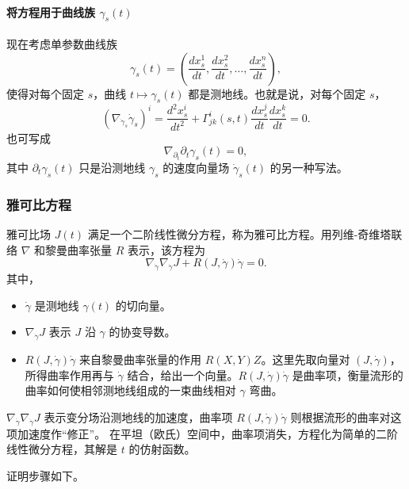 \paragraph{将方程用于曲线族 \texorpdfstring{$\gamma_s(t)$}{γₛ(t)}}
现在考虑单参数曲线族
\[
  \gamma_s(t)=\left(\frac{dx_s^1}{dt},\frac{dx_s^2}{dt},\ldots,
                     \frac{dx_s^n}{dt}\right),
\]
使得对每个固定 $s$，曲线 $t\mapsto\gamma_s(t)$ 都是测地线。也就是说，对每个固定 $s$，
\begin{equation*}
  (\nabla_{\dot\gamma_s}\dot\gamma_s)^i
    =\frac{d^2x_s^i}{dt^2}+\Gamma^i_{jk}(s,t)
       \frac{dx_s^j}{dt}\frac{dx_s^k}{dt}=0.
  \tag{5.34}\label{eq:5.34}
\end{equation*}
也可写成
\begin{equation*}
  \nabla_{\partial_t}\partial_t\gamma_s(t)=0,
  \tag{5.35}\label{eq:5.35}
\end{equation*}
其中 $\partial_t\gamma_s(t)$ 只是沿测地线 $\gamma_s$ 的速度向量场 $\dot\gamma_s(t)$ 的另一种写法。

\subsubsection{雅可比方程}
雅可比场 $J(t)$ 满足一个二阶线性微分方程，称为雅可比方程。用列维-奇维塔联络 $\nabla$ 和黎曼曲率张量 $R$ 表示，该方程为
\begin{equation*}
  \nabla_{\dot\gamma}\nabla_{\dot\gamma}J+R(J,\dot\gamma)\dot\gamma=0.
  \tag{5.36}\label{eq:5.36}
\end{equation*}
其中，
\begin{itemize}
  \item $\dot\gamma$ 是测地线 $\gamma(t)$ 的切向量。
  \item $\nabla_{\dot\gamma}J$ 表示 $J$ 沿 $\gamma$ 的协变导数。
  \item $R(J,\dot\gamma)\dot\gamma$ 来自黎曼曲率张量的作用 $R(X,Y)Z$。这里先取向量对 $(J,\dot\gamma)$，所得曲率作用再与 $\dot\gamma$ 结合，给出一个向量。$R(J,\dot\gamma)\dot\gamma$ 是曲率项，衡量流形的曲率如何使相邻测地线组成的一束曲线相对 $\gamma$ 弯曲。
\end{itemize}
$\nabla_{\dot\gamma}\nabla_{\dot\gamma}J$ 表示变分场沿测地线的加速度，曲率项 $R(J,\dot\gamma)\dot\gamma$ 则根据流形的曲率对这项加速度作“修正”。
在平坦（欧氏）空间中，曲率项消失，方程化为简单的二阶线性微分方程，其解是 $t$ 的仿射函数。

证明步骤如下。

